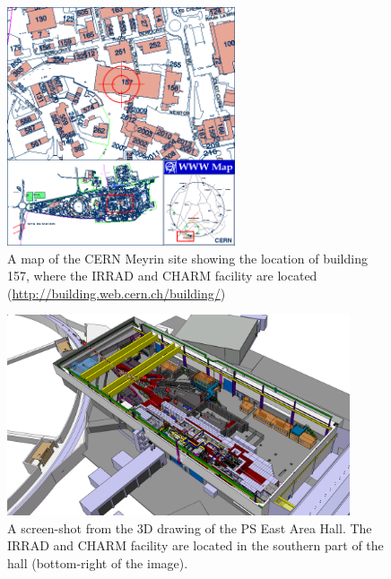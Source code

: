 \begin{figure}[!ht]
	\centering
	\includegraphics[width=0.6\textwidth]{./images/meyrin_map_157}
	\caption{A map of the CERN Meyrin site showing the location of building 157, where the IRRAD and CHARM facility are located (\url{http://building.web.cern.ch/building/})}
	\label{fig:meyrin_map}
\end{figure}

\begin{figure}[!ht]
	\centering
	\includegraphics[width=0.9\textwidth]{./images/EastArea-Vue3D-1}
	\caption{A screen-shot from the 3D drawing of the PS East Area Hall. The IRRAD and CHARM facility are located in the southern part of the hall (bottom-right of the image).}
	\label{fig:eastarea_hall_3d}
\end{figure}